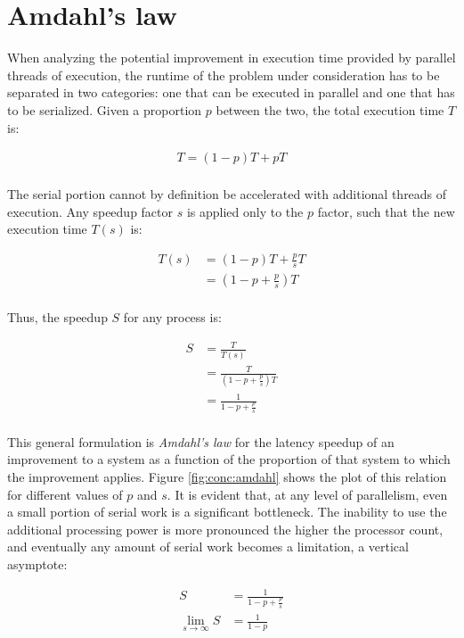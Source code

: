 \section{Amdahl's law}

When analyzing the potential improvement in execution time provided by parallel
threads of execution, the runtime of the problem under consideration has to be
separated in two categories: one that can be executed in parallel and one that
has to be serialized.  Given a proportion $p$ between the two, the total
execution time $T$ is:

\begin{align*}
    T = (1 - p)T + pT \\
\end{align*}

The serial portion cannot by definition be accelerated with additional threads
of execution.  Any speedup factor $s$ is applied only to the $p$ factor, such
that the new execution time $T(s)$ is:

\begin{align*}
    T(s) &=  (1 - p)T + \frac{p}{s}T \\
         &= (1 - p   + \frac{p}{s})T \\
\end{align*}

Thus, the speedup $S$ for any process is:

\begin{align*}
    S &= \frac{T}{T(s)} \\
      &= \frac{T}{(1 - p + \frac{p}{s})T} \\
      &= \frac{1}{ 1 - p + \frac{p}{s}} \\
\end{align*}

This general formulation is \textit{Amdahl's law} for the latency speedup of an
improvement to a system as a function of the proportion of that system to which
the improvement applies\footnotemark.  Figure \ref{fig:conc:amdahl} shows the
plot of this relation for different values of $p$ and $s$.  It is evident that,
at any level of parallelism, even a small portion of serial work is a
significant bottleneck.  The inability to use the additional processing power is
more pronounced the higher the processor count, and eventually any amount of
serial work becomes a limitation, a vertical asymptote:

\begin{align*}
    S &= \frac{1}{1 - p + \frac{p}{s}} \\
    \lim\limits_{s \to \infty} S &= \frac{1}{1 - p} \\
\end{align*}

